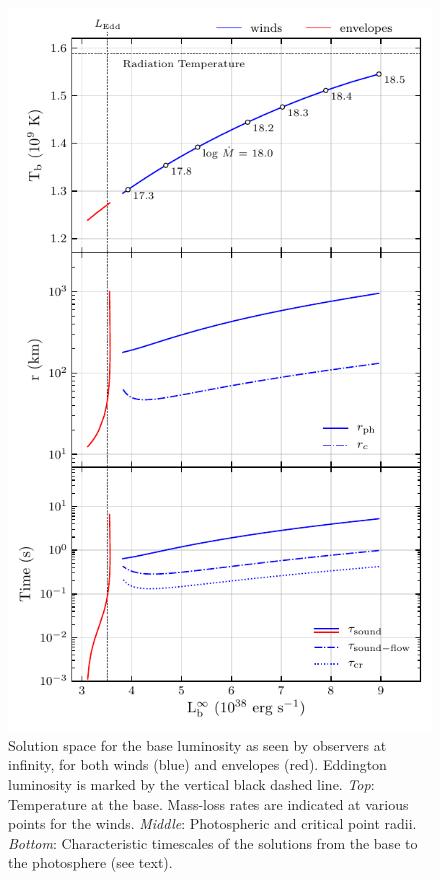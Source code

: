 \documentclass[../main.tex]{subfiles}
\begin{document}
\begin{figure}[H]
    \centering
    \includegraphics{figures/triple.pdf}
    \caption[Solution space for the base luminosity]{Solution space for the base luminosity as seen by observers at infinity, for both winds (blue) and envelopes (red).  Eddington luminosity is marked by the vertical black dashed line. \textit{Top}: Temperature at the base.  Mass-loss rates are indicated at various points for the winds.  \textit{Middle}: Photospheric and critical point radii.  \textit{Bottom}: Characteristic timescales of the solutions from the base to the photosphere (see text).}
    \label{fig:triple}
\end{figure}
\end{document}

